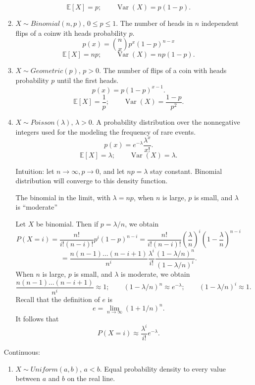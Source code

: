 \documentclass{article}
\newcommand{\bc}{\binom}
\newcommand{\EE}{\mathbb{E}}
\DeclareMathOperator{\Var}{Var}
\begin{document}
\begin{enumerate}
\begin{enumerate}
        \[
          \EE[X] = p; \qquad \Var(X) = p(1-p).
        \]
      \item $X \sim Binomial(n, p)$, $0 \leq p \leq 1$.  The number of heads in $n$ independent flips of a coinw ith heads probability $p$.
        \[
          p(x) = \bc{n}{x} p^x (1-p)^{n-x}
        \]
        \[
          \EE[X] = np; \qquad \Var(X) = np(1-p).
        \]
      \item $X \sim Geometric(p)$, $p > 0$.  The number of flips of a coin with heads probability $p$ until the first heads.
        \[
          p(x) = p (1-p)^{x-1}.
        \]
        \[
          \EE[X] = \frac{1}{p}; \qquad \Var(X) = \frac{1-p}{p^2}.
        \]
      \item $X \sim Poisson(\lambda)$, $\lambda > 0$.  A probability distribution over the nonnegative integers used for the modeling the frequency of rare events.
        \[
          p(x) = e^{-\lambda} \frac{\lambda^x}{x!}.
        \]
        \[
          \EE[X] = \lambda; \qquad \Var(X) = \lambda.
        \]

        Intuition: let $n \to \infty, p \to 0$, and let $np = \lambda$ stay constant.  Binomial distribution will converge to this density function.

          The binomial in the limit, with $\lambda = np$, when $n$ is large, $p$ is small, and $\lambda$ is ``moderate''

          Let $X$ be binomial.  Then if $p = \lambda / n$, we obtain
      \[
        P(X =i) = \frac{n!}{i! (n-i)!} p^i (1-p)^{n-i} = \frac{n!}{i! (n-i)!} \left( \frac{\lambda}{n} \right)^i \left( 1 - \frac{\lambda}{n} \right)^{n-i}
    \]
    \[
      = \frac{n(n-1) \dots (n-i+1)}{n^i} \frac{\lambda^i}{i!} \frac{(1-\lambda/n)^n}{(1 - \lambda/n)^i}.
    \]
    When $n$ is large, $p$ is small, and $\lambda$ is moderate, we obtain
    \[
      \frac{n(n-1) \dots (n-i+1)}{n^i} \approx 1; \qquad  (1-\lambda/n)^n \approx e^{-\lambda}; \qquad (1 - \lambda/n)^i \approx 1.
    \]
    Recall that the definition of $e$ is
    \[
      e = \lim_{n \to \infty} (1 + 1/n)^n.
    \]
    It follows that
    \[
      P(X=i) \approx \frac{\lambda^i}{i!} e^{-\lambda}.
    \]
    \end{enumerate}

    Continuous:

    \begin{enumerate}
      \item $X \sim Uniform(a, b)$, $a<b$.  Equal probability density to every value between $a$ and $b$ on the real line.


\end{enumerate}
\end{enumerate}
\end{document}
